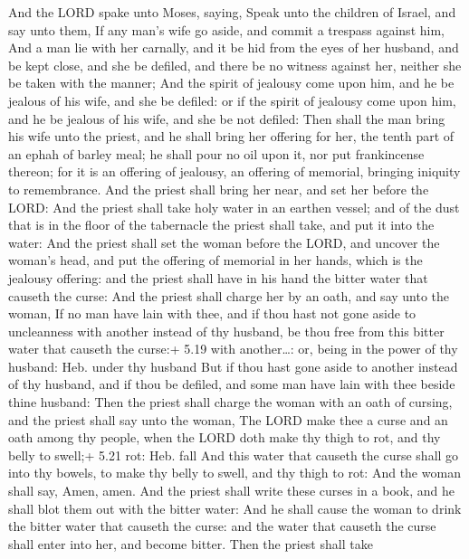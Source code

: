  And the LORD spake unto Moses, saying, 
Speak unto the children of Israel, and say unto them, If any man's wife
go aside, and commit a trespass against him,  And a man lie
with her carnally, and it be hid from the eyes of her husband, and be
kept close, and she be defiled, and there be no witness against her,
neither she be taken with the manner;  And the spirit of
jealousy come upon him, and he be jealous of his wife, and she be
defiled: or if the spirit of jealousy come upon him, and he be jealous
of his wife, and she be not defiled:  Then shall the man
bring his wife unto the priest, and he shall bring her offering for her,
the tenth part of an ephah of barley meal; he shall pour no oil upon it,
nor put frankincense thereon; for it is an offering of jealousy, an
offering of memorial, bringing iniquity to remembrance. 
And the priest shall bring her near, and set her before the LORD:
 And the priest shall take holy water in an earthen vessel;
and of the dust that is in the floor of the tabernacle the priest shall
take, and put it into the water:  And the priest shall set
the woman before the LORD, and uncover the woman's head, and put the
offering of memorial in her hands, which is the jealousy offering: and
the priest shall have in his hand the bitter water that causeth the
curse:  And the priest shall charge her by an oath, and say
unto the woman, If no man have lain with thee, and if thou hast not gone
aside to uncleanness with another instead of thy husband, be thou free
from this bitter water that causeth the curse:+ 5.19 with another\ldots:
or, being in the power of thy husband: Heb. under thy husband
 But if thou hast gone aside to another instead of thy
husband, and if thou be defiled, and some man have lain with thee beside
thine husband:  Then the priest shall charge the woman with
an oath of cursing, and the priest shall say unto the woman, The LORD
make thee a curse and an oath among thy people, when the LORD doth make
thy thigh to rot, and thy belly to swell;+ 5.21 rot: Heb. fall
 And this water that causeth the curse shall go into thy
bowels, to make thy belly to swell, and thy thigh to rot: And the woman
shall say, Amen, amen.  And the priest shall write these
curses in a book, and he shall blot them out with the bitter water:
 And he shall cause the woman to drink the bitter water
that causeth the curse: and the water that causeth the curse shall enter
into her, and become bitter.  Then the priest shall take
